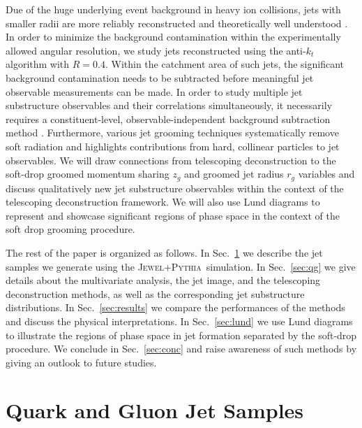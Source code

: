 \documentclass[notoc]{JHEP3}
\newcommand{\jwpy}{\textsc{Jewel+Pythia}~}
\begin{document}
Due of the huge underlying event background in heavy ion collisions, jets with smaller radii are more reliably reconstructed and theoretically well understood \cite{Dasgupta:2014yra,Chien:2015cka,Becher:2015hka,Kang:2016mcy}. In order to minimize the background contamination within the experimentally allowed angular resolution, we study jets reconstructed using the anti-$k_t$ algorithm \cite{Cacciari:2008gp} with $R=0.4$. Within the catchment area of such jets, the significant background contamination needs to be subtracted before meaningful jet observable measurements can be made. In order to study multiple jet substructure observables and their correlations simultaneously, it necessarily requires a constituent-level, observable-independent background subtraction method \cite{Soyez:2012hv,Cacciari:2014gra,Berta:2014eza,Bertolini:2014bba,Komiske:2017ubm}. Furthermore, various jet grooming techniques \cite{Ellis:2009su,Ellis:2009me,Krohn:2009th,Dasgupta:2013ihk,Larkoski:2014wba} systematically remove soft radiation and highlights contributions from hard, collinear particles to jet observables. We will draw connections from telescoping deconstruction to the soft-drop groomed momentum sharing $z_g$ and groomed jet radius $r_g$ variables \cite{Larkoski:2014wba} and discuss qualitatively new jet substructure observables within the context of the telescoping deconstruction framework. We will also use Lund diagrams \cite{Andersson1989,Salam:2016yht} to represent and showcase significant regions of phase space in the context of the soft drop grooming procedure.

The rest of the paper is organized as follows. In Sec.~\ref{sec:sample} we describe the jet samples we generate using the \jwpy simulation. In Sec.~\ref{sec:qg} we give details about the multivariate analysis, the jet image, and the telescoping deconstruction methods, as well as the corresponding jet substructure distributions. In Sec.~\ref{sec:results} we compare the performances of the methods and discuss the physical interpretations. In Sec.~\ref{sec:lund} we use Lund diagrams to illustrate the regions of phase space in jet formation separated by the soft-drop procedure. We conclude in Sec.~\ref{sec:conc} and raise awareness of such methods by giving an outlook to future studies.


\section{Quark and Gluon Jet Samples}
\label{sec:sample}
\end{document}
